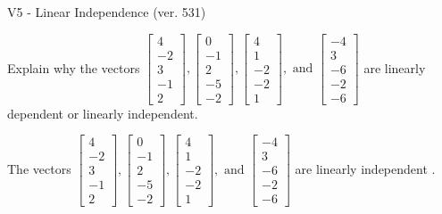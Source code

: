 \begin{exercise}
  \begin{exerciseTitle}V5 - Linear Independence (ver. 531)\end{exerciseTitle}
  \begin{exerciseStatement}
    Explain why the vectors \(\left[\begin{array}{r}
4 \\
-2 \\
3 \\
-1 \\
2
\end{array}\right] , \left[\begin{array}{r}
0 \\
-1 \\
2 \\
-5 \\
-2
\end{array}\right] , \left[\begin{array}{r}
4 \\
1 \\
-2 \\
-2 \\
1
\end{array}\right] , \text{ and } \left[\begin{array}{r}
-4 \\
3 \\
-6 \\
-2 \\
-6
\end{array}\right]\) are linearly dependent or linearly independent.	


  \end{exerciseStatement}
  \begin{exerciseAnswer}
   The vectors \(\left[\begin{array}{r}
4 \\
-2 \\
3 \\
-1 \\
2
\end{array}\right] , \left[\begin{array}{r}
0 \\
-1 \\
2 \\
-5 \\
-2
\end{array}\right] , \left[\begin{array}{r}
4 \\
1 \\
-2 \\
-2 \\
1
\end{array}\right] , \text{ and } \left[\begin{array}{r}
-4 \\
3 \\
-6 \\
-2 \\
-6
\end{array}\right]\) are 
  	 linearly independent  .
  


  \end{exerciseAnswer}
\end{exercise}